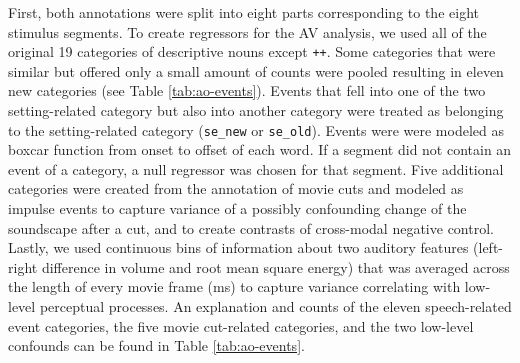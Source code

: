 \documentclass[english]{article}
\begin{document}
First, both annotations were split into eight parts corresponding to the eight
stimulus segments.
To create regressors for the AV analysis, we used all of the original 19
categories of descriptive nouns except \texttt{++}.
Some categories that were similar but offered only a small
amount of counts were pooled resulting in eleven new categories (see Table
\ref{tab:ao-events}). Events that fell into one of the two setting-related
category but also into another category were treated as belonging to the
setting-related category (\texttt{se\_new} or \texttt{se\_old}).
Events were were modeled as boxcar function from onset to offset of each word.
If a segment did not contain an event of a category, a null regressor was chosen
for that segment.  
Five additional categories were created from the annotation of movie cuts and
modeled as impulse events to capture variance of a possibly confounding change
of the soundscape after a cut, and to create contrasts of cross-modal negative
control.
Lastly, we used continuous bins of information about two auditory features
(left-right difference in volume and root mean square energy) that was averaged
across the length of every movie frame (\unit[40]{ms}) to capture variance
correlating with low-level perceptual processes.
An explanation and counts of the eleven speech-related event categories, the
five movie cut-related categories, and the two low-level confounds can be found
in Table \ref{tab:ao-events}.
\end{document}
